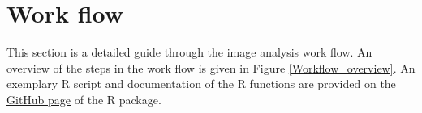 \documentclass{report}
\begin{document}
\section{Work flow}

This section is a detailed guide through the image analysis work flow. An overview of the steps in the work flow is given in Figure \ref{Workflow_overview}. An exemplary R script and documentation of the R functions are provided on the \href{https://github.com/juliaquach02/cellcontacts}{GitHub page} of the R package.

\end{document}
